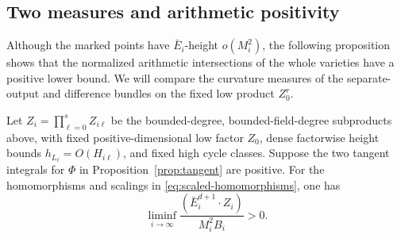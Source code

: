 \subsection{Two measures and arithmetic positivity}

Although the marked points have \(\bar E_i\)-height \(o(M_i^2)\), the
following proposition shows that the normalized arithmetic intersections
of the whole varieties have a positive lower bound.  We will compare the
curvature measures of the separate-output and difference bundles on the
fixed low product \(Z_0^r\).

\begin{proposition}\label{prop:arithmetic-positive}
Let \(Z_i=\prod_{\ell=0}^s Z_{i\ell}\) be the bounded-degree,
bounded-field-degree subproducts above, with fixed positive-dimensional
low factor \(Z_0\), dense factorwise height bounds
\(h_{L_\ell}=O(H_{i\ell})\), and fixed high cycle classes.  Suppose the
two tangent integrals for \(\Phi\) in
Proposition~\ref{prop:tangent} are positive.  For the homomorphisms and
scalings in \eqref{eq:scaled-homomorphisms}, one has
\begin{equation}\label{eq:arithmetic-positive}
 \liminf_{i\to\infty}
 \frac{(\bar E_i^{d+1}\cdot Z_i)}{M_i^2B_i}>0.
\end{equation}
\end{proposition}


